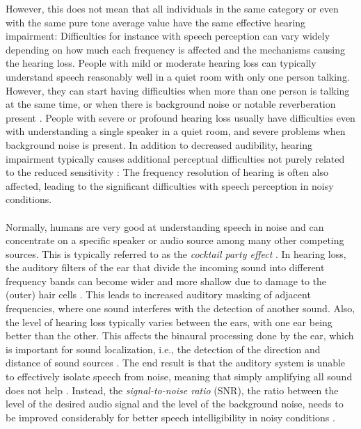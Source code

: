 \documentclass[english, 12pt, a4paper, pdftex, elec, utf8]{aaltothesis}
\begin{document}
However, this does not mean that all individuals in the same category or even with the same pure tone average value have the same effective hearing impairment: Difficulties for instance with speech perception can vary widely depending on how much each frequency is affected and the mechanisms causing the hearing loss. People with mild or moderate hearing loss can typically understand speech reasonably well in a quiet room with only one person talking. However, they can start having difficulties when more than one person is talking at the same time, or when there is background noise or notable reverberation present \cite{peterson2010cochlear}. People with severe or profound hearing loss usually have difficulties even with understanding a single speaker in a quiet room, and severe problems when background noise is present. In addition to decreased audibility, hearing impairment typically causes additional perceptual difficulties not purely related to the reduced sensitivity \cite{moore2007cochlear}: The frequency resolution of hearing is often also affected, leading to the significant difficulties with speech perception in noisy conditions. \\\\
Normally, humans are very good at understanding speech in noise and can concentrate on a specific speaker or audio source among many other competing sources. This is typically referred to as the \textit{cocktail party effect} \cite{bronkhorst2000cocktail}. In hearing loss, the auditory filters of the ear that divide the incoming sound into different frequency bands can become wider and more shallow due to damage to the (outer) hair cells \cite{moore2007cochlear}. This leads to increased auditory masking of adjacent frequencies, where one sound interferes with the detection of another sound. Also, the level of hearing loss typically varies between the ears, with one ear being better than the other. This affects the binaural processing done by the ear, which is important for sound localization, i.e., the detection of the direction and distance of sound sources \cite{moore2007cochlear, pulkki2015communication}. The end result is that the auditory system is unable to effectively isolate speech from noise, meaning that simply amplifying all sound does not help \cite[p.~233--234]{moore2007cochlear}. Instead, the \textit{signal-to-noise ratio} (SNR), the ratio between the level of the desired audio signal and the level of the background noise, needs to be improved considerably for better speech intelligibility in noisy conditions \cite{healy2016difficulty, fink2008benefit}.
\end{document}
